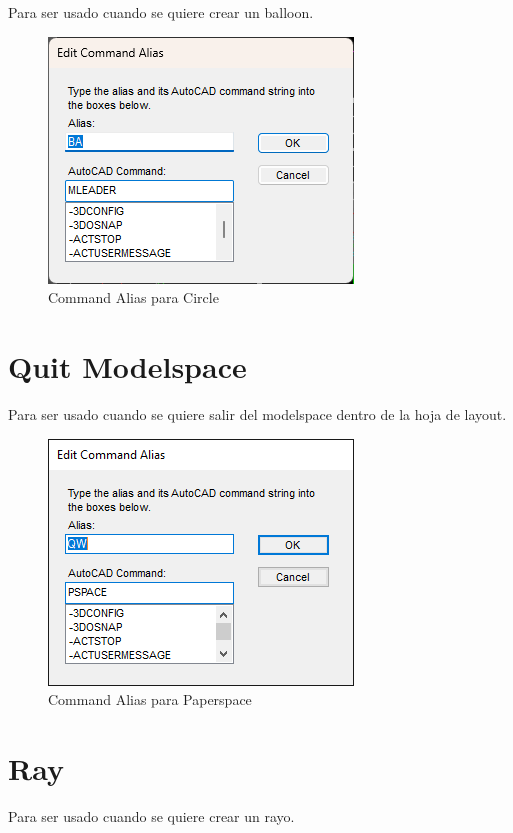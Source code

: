 \documentclass[12pt,letterpaper,final]{report}
\begin{document}
Para ser usado cuando se quiere crear un balloon.

\begin{figure}[H]
	\centering
	\includegraphics[width=0.55\linewidth, height=0.45\textheight,keepaspectratio]{Imagenes/autocad_alias_mleader_01}
	\caption{Command Alias para Circle}
	\label{fig:autocadaliasmleader01}
\end{figure}

\section{Quit Modelspace}

Para ser usado cuando se quiere salir del modelspace dentro de la hoja de layout.

\begin{figure}[H]
	\centering
	\includegraphics[width=0.55\linewidth, height=0.45\textheight,keepaspectratio]{Imagenes/autocad_alias_quitmodelspace}
	\caption{Command Alias para Paperspace}
	\label{fig:autocadaliasquitmodelspace}
\end{figure}

\section{Ray}

Para ser usado cuando se quiere crear un rayo.
\end{document}
